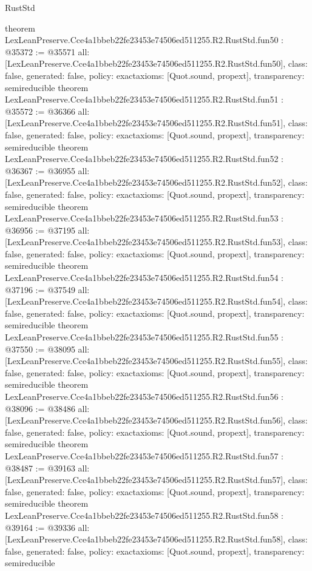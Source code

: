 \begin{lexlean}{RustStd}
\begin{coremodule}
{}
theorem LexLeanPreserve.Cce4a1bbeb22fe23453e74506ed511255.R2.RustStd.fun50 : @35372 := @35571 {
  all: [LexLeanPreserve.Cce4a1bbeb22fe23453e74506ed511255.R2.RustStd.fun50],
  class: false,
  generated: false,
  policy: exact{axioms: [Quot.sound, propext]},
  transparency: semireducible
}
theorem LexLeanPreserve.Cce4a1bbeb22fe23453e74506ed511255.R2.RustStd.fun51 : @35572 := @36366 {
  all: [LexLeanPreserve.Cce4a1bbeb22fe23453e74506ed511255.R2.RustStd.fun51],
  class: false,
  generated: false,
  policy: exact{axioms: [Quot.sound, propext]},
  transparency: semireducible
}
theorem LexLeanPreserve.Cce4a1bbeb22fe23453e74506ed511255.R2.RustStd.fun52 : @36367 := @36955 {
  all: [LexLeanPreserve.Cce4a1bbeb22fe23453e74506ed511255.R2.RustStd.fun52],
  class: false,
  generated: false,
  policy: exact{axioms: [Quot.sound, propext]},
  transparency: semireducible
}
theorem LexLeanPreserve.Cce4a1bbeb22fe23453e74506ed511255.R2.RustStd.fun53 : @36956 := @37195 {
  all: [LexLeanPreserve.Cce4a1bbeb22fe23453e74506ed511255.R2.RustStd.fun53],
  class: false,
  generated: false,
  policy: exact{axioms: [Quot.sound, propext]},
  transparency: semireducible
}
theorem LexLeanPreserve.Cce4a1bbeb22fe23453e74506ed511255.R2.RustStd.fun54 : @37196 := @37549 {
  all: [LexLeanPreserve.Cce4a1bbeb22fe23453e74506ed511255.R2.RustStd.fun54],
  class: false,
  generated: false,
  policy: exact{axioms: [Quot.sound, propext]},
  transparency: semireducible
}
theorem LexLeanPreserve.Cce4a1bbeb22fe23453e74506ed511255.R2.RustStd.fun55 : @37550 := @38095 {
  all: [LexLeanPreserve.Cce4a1bbeb22fe23453e74506ed511255.R2.RustStd.fun55],
  class: false,
  generated: false,
  policy: exact{axioms: [Quot.sound, propext]},
  transparency: semireducible
}
theorem LexLeanPreserve.Cce4a1bbeb22fe23453e74506ed511255.R2.RustStd.fun56 : @38096 := @38486 {
  all: [LexLeanPreserve.Cce4a1bbeb22fe23453e74506ed511255.R2.RustStd.fun56],
  class: false,
  generated: false,
  policy: exact{axioms: [Quot.sound, propext]},
  transparency: semireducible
}
theorem LexLeanPreserve.Cce4a1bbeb22fe23453e74506ed511255.R2.RustStd.fun57 : @38487 := @39163 {
  all: [LexLeanPreserve.Cce4a1bbeb22fe23453e74506ed511255.R2.RustStd.fun57],
  class: false,
  generated: false,
  policy: exact{axioms: [Quot.sound, propext]},
  transparency: semireducible
}
theorem LexLeanPreserve.Cce4a1bbeb22fe23453e74506ed511255.R2.RustStd.fun58 : @39164 := @39336 {
  all: [LexLeanPreserve.Cce4a1bbeb22fe23453e74506ed511255.R2.RustStd.fun58],
  class: false,
  generated: false,
  policy: exact{axioms: [Quot.sound, propext]},
  transparency: semireducible
}
\end{coremodule}
\end{lexlean}
